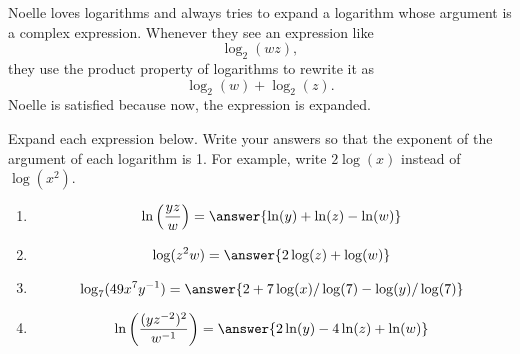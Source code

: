 \documentclass{ximera}
\author{Kenneth Berglund}
\begin{document}
Noelle loves logarithms and always tries to expand a logarithm whose argument is a complex expression. Whenever they see an expression like 
$$
\log_2\left(wz\right),
$$
they use the product property of logarithms to rewrite it as 
$$
\log_2(w) + \log_2(z). 
$$
Noelle is satisfied because now, the expression is expanded. 

\begin{exercise}
Expand each expression below. Write your answers so that the exponent of the argument of each logarithm is 1. For example, write $2\log(x)$ instead of $\log(x^2)$. 
\begin{enumerate}
\item 
$$
\ln\left(\frac{yz}{w}\right) = \answer{\ln(y) + \ln(z) - \ln(w)}
$$

\item 
$$
\log(z^2w) = \answer{2\log(z) + \log(w)}
$$

\item 
$$
\log_7(49x^7y^{-1}) = \answer{2 + 7\log(x)/\log(7) - \log(y)/\log(7)}
$$

\item 
$$
\ln\left(\frac{(yz^{-2})^2}{w^{-1}}\right) = \answer{2\ln(y) - 4\ln(z) + \ln(w)}
$$

\end{enumerate}


\end{exercise}
\end{document}
